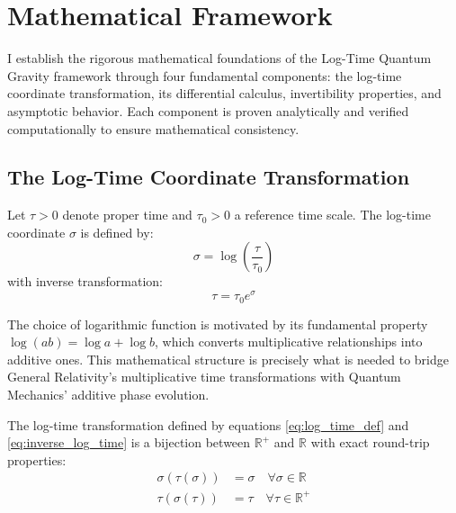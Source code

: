 \section{Mathematical Framework}
\label{sec:mathematical_framework}

I establish the rigorous mathematical foundations of the Log-Time Quantum Gravity framework through four fundamental components: the log-time coordinate transformation, its differential calculus, invertibility properties, and asymptotic behavior. Each component is proven analytically and verified computationally to ensure mathematical consistency.

\subsection{The Log-Time Coordinate Transformation}
\label{subsec:log_time_transformation}

\begin{definition}
Let $\tau > 0$ denote proper time and $\tau_0 > 0$ a reference time scale. The log-time coordinate $\sigma$ is defined by:
\begin{equation}
\sigma = \log\left(\frac{\tau}{\tau_0}\right)
\label{eq:log_time_def}
\end{equation}
with inverse transformation:
\begin{equation}
\tau = \tau_0 e^\sigma
\label{eq:inverse_log_time}
\end{equation}
\end{definition}

The choice of logarithmic function is motivated by its fundamental property $\log(ab) = \log a + \log b$, which converts multiplicative relationships into additive ones. This mathematical structure is precisely what is needed to bridge General Relativity's multiplicative time transformations with Quantum Mechanics' additive phase evolution.

\begin{theorem}
\label{thm:invertibility}
The log-time transformation defined by equations \eqref{eq:log_time_def} and \eqref{eq:inverse_log_time} is a bijection between $\mathbb{R}^+$ and $\mathbb{R}$ with exact round-trip properties:
\begin{align}
\sigma(\tau(\sigma)) &= \sigma \quad \forall \sigma \in \mathbb{R} \\
\tau(\sigma(\tau)) &= \tau \quad \forall \tau \in \mathbb{R}^+
\end{align}
\end{theorem}


